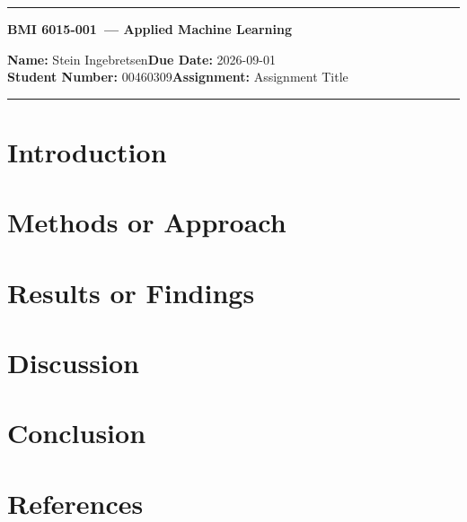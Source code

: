 \documentclass[12pt,letterpaper]{article}
\newcommand{\StudentName}{Stein Ingebretsen}
\newcommand{\StudentID}{00460309}
\newcommand{\CourseCode}{BMI 6015-001}
\newcommand{\CourseTitle}{Applied Machine Learning}
\newcommand{\AssignmentTitle}{Assignment Title}
\newcommand{\DueDate}{2026-09-01}
\begin{document}
\thispagestyle{firstpage}

\begin{center}
	\hrule
	\vspace{0.4cm}
	{\large\textbf{\CourseCode\ --- \CourseTitle}}
\end{center}
\textbf{Name:} \StudentName\hfill\textbf{Due Date:} \DueDate\\
\textbf{Student Number:} \StudentID\hfill\textbf{Assignment:} \AssignmentTitle\\
\hrule

\vspace{0.6em}
\vspace{0.4em}

\section{Introduction}

\section{Methods or Approach}

\section{Results or Findings}

\section{Discussion}

\section{Conclusion}

\section{References}






\end{document}
